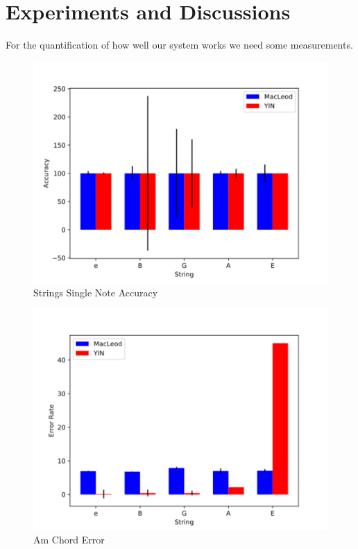 \chapter{Experiments and Discussions}

For the quantification of how well our system works we need some measurements.

\begin{figure}[!htpb]
  \centering
  \caption{Strings Single Note Accuracy}
  \label{single-note-accuracy}
  \includegraphics[scale=0.85]{images/measurements/single-note-accuracy}
\end{figure}

\begin{figure}[!htpb]
  \centering
  \caption{Am Chord Error}
  \label{am-chord-error}
  \includegraphics[scale=0.85]{images/measurements/am-chord-error}
\end{figure}

